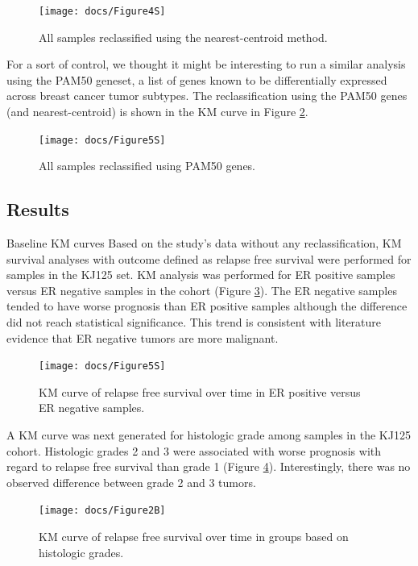 \documentclass[a4paper,10pt]{article}
\begin{document}
\begin{figure}
\centering
\texttt{[image: docs/Figure4S]}
\caption{All samples reclassified using the nearest-centroid method.}\label{4S}
\end{figure}
For a sort of control, we thought it might be interesting to run a similar 
analysis using the PAM50 geneset, a list of genes known to be differentially
 expressed across breast cancer tumor subtypes. The reclassification using 
the PAM50 genes (and nearest-centroid) is shown in the KM curve in Figure \ref{5S}.
 \begin{figure}
\centering
\texttt{[image: docs/Figure5S]}
\caption{All samples reclassified using PAM50 genes.}\label{5S}
\end{figure}

\subsection{Results}
Baseline KM curves
Based on the study’s data without any reclassification, KM survival analyses with outcome 
defined as relapse free survival were performed for samples in the KJ125 set.   KM analysis 
was performed for ER positive samples versus ER negative samples in the cohort (Figure \ref{1B}). 
The ER negative samples tended to have worse prognosis than ER positive samples although 
the difference did not reach statistical significance. This trend is consistent with literature 
evidence that ER negative tumors are more malignant.  

 \begin{figure}
\centering
\texttt{[image: docs/Figure5S]}
\caption{ KM curve of relapse free survival over time in ER positive versus ER negative samples.}\label{1B}
\end{figure}
A KM curve was next generated for histologic grade among samples in the KJ125 cohort.  
Histologic grades 2 and 3 were associated with worse prognosis with regard to relapse 
free survival than grade 1 (Figure \ref{2B}).  Interestingly, there was no observed difference 
between grade 2 and 3 tumors.  

 \begin{figure}
\centering
\texttt{[image: docs/Figure2B]}
\caption{ KM curve of relapse free survival over time in groups based on histologic grades.}\label{2B}
\end{figure}
\end{document}
